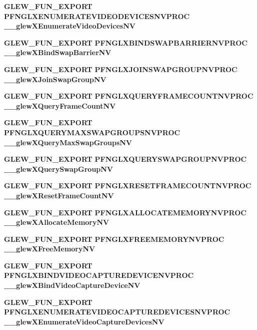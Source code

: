 \begin{DoxyCompactItemize}
\item 
{\bf G\+L\+E\+W\+\_\+\+F\+U\+N\+\_\+\+E\+X\+P\+O\+RT} {\bf P\+F\+N\+G\+L\+X\+E\+N\+U\+M\+E\+R\+A\+T\+E\+V\+I\+D\+E\+O\+D\+E\+V\+I\+C\+E\+S\+N\+V\+P\+R\+OC} {\bf \+\_\+\+\_\+glew\+X\+Enumerate\+Video\+Devices\+NV}
\item 
{\bf G\+L\+E\+W\+\_\+\+F\+U\+N\+\_\+\+E\+X\+P\+O\+RT} {\bf P\+F\+N\+G\+L\+X\+B\+I\+N\+D\+S\+W\+A\+P\+B\+A\+R\+R\+I\+E\+R\+N\+V\+P\+R\+OC} {\bf \+\_\+\+\_\+glew\+X\+Bind\+Swap\+Barrier\+NV}
\item 
{\bf G\+L\+E\+W\+\_\+\+F\+U\+N\+\_\+\+E\+X\+P\+O\+RT} {\bf P\+F\+N\+G\+L\+X\+J\+O\+I\+N\+S\+W\+A\+P\+G\+R\+O\+U\+P\+N\+V\+P\+R\+OC} {\bf \+\_\+\+\_\+glew\+X\+Join\+Swap\+Group\+NV}
\item 
{\bf G\+L\+E\+W\+\_\+\+F\+U\+N\+\_\+\+E\+X\+P\+O\+RT} {\bf P\+F\+N\+G\+L\+X\+Q\+U\+E\+R\+Y\+F\+R\+A\+M\+E\+C\+O\+U\+N\+T\+N\+V\+P\+R\+OC} {\bf \+\_\+\+\_\+glew\+X\+Query\+Frame\+Count\+NV}
\item 
{\bf G\+L\+E\+W\+\_\+\+F\+U\+N\+\_\+\+E\+X\+P\+O\+RT} {\bf P\+F\+N\+G\+L\+X\+Q\+U\+E\+R\+Y\+M\+A\+X\+S\+W\+A\+P\+G\+R\+O\+U\+P\+S\+N\+V\+P\+R\+OC} {\bf \+\_\+\+\_\+glew\+X\+Query\+Max\+Swap\+Groups\+NV}
\item 
{\bf G\+L\+E\+W\+\_\+\+F\+U\+N\+\_\+\+E\+X\+P\+O\+RT} {\bf P\+F\+N\+G\+L\+X\+Q\+U\+E\+R\+Y\+S\+W\+A\+P\+G\+R\+O\+U\+P\+N\+V\+P\+R\+OC} {\bf \+\_\+\+\_\+glew\+X\+Query\+Swap\+Group\+NV}
\item 
{\bf G\+L\+E\+W\+\_\+\+F\+U\+N\+\_\+\+E\+X\+P\+O\+RT} {\bf P\+F\+N\+G\+L\+X\+R\+E\+S\+E\+T\+F\+R\+A\+M\+E\+C\+O\+U\+N\+T\+N\+V\+P\+R\+OC} {\bf \+\_\+\+\_\+glew\+X\+Reset\+Frame\+Count\+NV}
\item 
{\bf G\+L\+E\+W\+\_\+\+F\+U\+N\+\_\+\+E\+X\+P\+O\+RT} {\bf P\+F\+N\+G\+L\+X\+A\+L\+L\+O\+C\+A\+T\+E\+M\+E\+M\+O\+R\+Y\+N\+V\+P\+R\+OC} {\bf \+\_\+\+\_\+glew\+X\+Allocate\+Memory\+NV}
\item 
{\bf G\+L\+E\+W\+\_\+\+F\+U\+N\+\_\+\+E\+X\+P\+O\+RT} {\bf P\+F\+N\+G\+L\+X\+F\+R\+E\+E\+M\+E\+M\+O\+R\+Y\+N\+V\+P\+R\+OC} {\bf \+\_\+\+\_\+glew\+X\+Free\+Memory\+NV}
\item 
{\bf G\+L\+E\+W\+\_\+\+F\+U\+N\+\_\+\+E\+X\+P\+O\+RT} {\bf P\+F\+N\+G\+L\+X\+B\+I\+N\+D\+V\+I\+D\+E\+O\+C\+A\+P\+T\+U\+R\+E\+D\+E\+V\+I\+C\+E\+N\+V\+P\+R\+OC} {\bf \+\_\+\+\_\+glew\+X\+Bind\+Video\+Capture\+Device\+NV}
\item 
{\bf G\+L\+E\+W\+\_\+\+F\+U\+N\+\_\+\+E\+X\+P\+O\+RT} {\bf P\+F\+N\+G\+L\+X\+E\+N\+U\+M\+E\+R\+A\+T\+E\+V\+I\+D\+E\+O\+C\+A\+P\+T\+U\+R\+E\+D\+E\+V\+I\+C\+E\+S\+N\+V\+P\+R\+OC} {\bf \+\_\+\+\_\+glew\+X\+Enumerate\+Video\+Capture\+Devices\+NV}

\end{DoxyCompactItemize}
